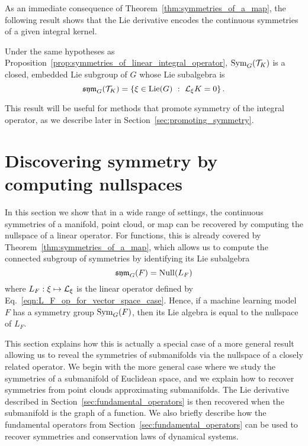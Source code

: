 \documentclass[twoside,11pt]{article}
\begin{document}
As an immediate consequence of Theorem~\ref{thm:symmetries_of_a_map}, the following result shows that the Lie derivative encodes the continuous symmetries of a given integral kernel.
\begin{corollary}
    Under the same hypotheses as Proposition~\ref{prop:symmetries_of_linear_integral_operator},
    $\operatorname{Sym}_G({\mathcal{T}}_K)$ is a closed, embedded Lie subgroup of $G$ whose Lie subalgebra is
    \begin{equation}
        \operatorname{\mathfrak{sym}}_G({\mathcal{T}}_K) = \left\{ \xi\in\operatorname{Lie}(G) \ : \ {\mathcal{L}}_{\xi} K = 0 \right\}.
    \end{equation}
\end{corollary}
This result will be useful for methods that promote symmetry of the integral operator, as we describe later in Section~\ref{sec:promoting_symmetry}.


\section{Discovering symmetry by computing nullspaces}
\label{sec:discovering_symmetry}
In this section we show that in a wide range of settings, the continuous symmetries of a manifold, point cloud, or map can be recovered by computing the nullspace of a linear operator.
For functions, this is already covered by Theorem~\ref{thm:symmetries_of_a_map}, which allows us to compute the connected subgroup of symmetries by identifying its Lie subalgebra
\begin{equation}
    \operatorname{\mathfrak{sym}}_G(F) = \operatorname{Null}(L_F)
\end{equation}
where $L_F: \xi \mapsto {\mathcal{L}}_{\xi}$ is the linear operator defined by Eq.~\ref{eqn:L_F_op_for_vector_space_case}.
Hence, if a machine learning model $F$ has a symmetry group $\operatorname{Sym}_G(F)$, then its Lie algebra is equal to the nullspace of $L_F$.

This section explains how this is actually a special case of a more general result allowing us to reveal the symmetries of submanifolds via the nullspace of a closely related operator.
We begin with the more general case where we study the symmetries of a submanifold of Euclidean space, and we explain how to recover symmetries from point clouds approximating submanifolds.
The Lie derivative described in Section~\ref{sec:fundamental_operators} is then recovered when the submanifold is the graph of a function.
We also briefly describe how the fundamental operators from Section~\ref{sec:fundamental_operators} can be used to recover symmetries and conservation laws of dynamical systems.
\end{document}
